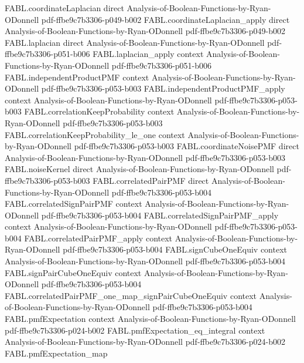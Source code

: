 \begin{theorem}
  {FABL.coordinateLaplacian}
  {direct}
  {Analysis-of-Boolean-Functions-by-Ryan-ODonnell}
  {pdf-ffbe9c7b3306-p049-b002}
\proofstep
  {FABL.coordinateLaplacian_apply}
  {direct}
  {Analysis-of-Boolean-Functions-by-Ryan-ODonnell}
  {pdf-ffbe9c7b3306-p049-b002}
\proofstep
  {FABL.laplacian}
  {direct}
  {Analysis-of-Boolean-Functions-by-Ryan-ODonnell}
  {pdf-ffbe9c7b3306-p051-b006}
\proofstep
  {FABL.laplacian_apply}
  {context}
  {Analysis-of-Boolean-Functions-by-Ryan-ODonnell}
  {pdf-ffbe9c7b3306-p051-b006}
\proofstep
  {FABL.independentProductPMF}
  {context}
  {Analysis-of-Boolean-Functions-by-Ryan-ODonnell}
  {pdf-ffbe9c7b3306-p053-b003}
\proofstep
  {FABL.independentProductPMF_apply}
  {context}
  {Analysis-of-Boolean-Functions-by-Ryan-ODonnell}
  {pdf-ffbe9c7b3306-p053-b003}
\proofstep
  {FABL.correlationKeepProbability}
  {context}
  {Analysis-of-Boolean-Functions-by-Ryan-ODonnell}
  {pdf-ffbe9c7b3306-p053-b003}
\proofstep
  {FABL.correlationKeepProbability_le_one}
  {context}
  {Analysis-of-Boolean-Functions-by-Ryan-ODonnell}
  {pdf-ffbe9c7b3306-p053-b003}
\proofstep
  {FABL.coordinateNoisePMF}
  {direct}
  {Analysis-of-Boolean-Functions-by-Ryan-ODonnell}
  {pdf-ffbe9c7b3306-p053-b003}
\proofstep
  {FABL.noiseKernel}
  {direct}
  {Analysis-of-Boolean-Functions-by-Ryan-ODonnell}
  {pdf-ffbe9c7b3306-p053-b003}
\proofstep
  {FABL.correlatedPairPMF}
  {direct}
  {Analysis-of-Boolean-Functions-by-Ryan-ODonnell}
  {pdf-ffbe9c7b3306-p053-b004}
\proofstep
  {FABL.correlatedSignPairPMF}
  {context}
  {Analysis-of-Boolean-Functions-by-Ryan-ODonnell}
  {pdf-ffbe9c7b3306-p053-b004}
\proofstep
  {FABL.correlatedSignPairPMF_apply}
  {context}
  {Analysis-of-Boolean-Functions-by-Ryan-ODonnell}
  {pdf-ffbe9c7b3306-p053-b004}
\proofstep
  {FABL.correlatedPairPMF_apply}
  {context}
  {Analysis-of-Boolean-Functions-by-Ryan-ODonnell}
  {pdf-ffbe9c7b3306-p053-b004}
\proofstep
  {FABL.signCubeOneEquiv}
  {context}
  {Analysis-of-Boolean-Functions-by-Ryan-ODonnell}
  {pdf-ffbe9c7b3306-p053-b004}
\proofstep
  {FABL.signPairCubeOneEquiv}
  {context}
  {Analysis-of-Boolean-Functions-by-Ryan-ODonnell}
  {pdf-ffbe9c7b3306-p053-b004}
\proofstep
  {FABL.correlatedPairPMF_one_map_signPairCubeOneEquiv}
  {context}
  {Analysis-of-Boolean-Functions-by-Ryan-ODonnell}
  {pdf-ffbe9c7b3306-p053-b004}
\proofstep
  {FABL.pmfExpectation}
  {context}
  {Analysis-of-Boolean-Functions-by-Ryan-ODonnell}
  {pdf-ffbe9c7b3306-p024-b002}
\proofstep
  {FABL.pmfExpectation_eq_integral}
  {context}
  {Analysis-of-Boolean-Functions-by-Ryan-ODonnell}
  {pdf-ffbe9c7b3306-p024-b002}
\proofstep
  {FABL.pmfExpectation_map}

\end{theorem}
